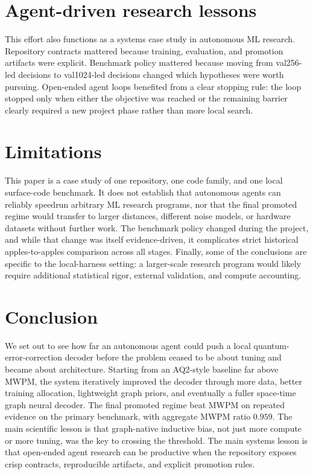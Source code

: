 \documentclass{article}
\begin{document}
\section{Agent-driven research lessons}
This effort also functions as a systems case study in autonomous ML research. Repository contracts mattered because training, evaluation, and promotion artifacts were explicit. Benchmark policy mattered because moving from val256-led decisions to val1024-led decisions changed which hypotheses were worth pursuing. Open-ended agent loops benefited from a clear stopping rule: the loop stopped only when either the objective was reached or the remaining barrier clearly required a new project phase rather than more local search.

\section{Limitations}
This paper is a case study of one repository, one code family, and one local surface-code benchmark. It does not establish that autonomous agents can reliably speedrun arbitrary ML research programs, nor that the final promoted regime would transfer to larger distances, different noise models, or hardware datasets without further work. The benchmark policy changed during the project, and while that change was itself evidence-driven, it complicates strict historical apples-to-apples comparison across all stages. Finally, some of the conclusions are specific to the local-harness setting: a larger-scale research program would likely require additional statistical rigor, external validation, and compute accounting.

\section{Conclusion}
We set out to see how far an autonomous agent could push a local quantum-error-correction decoder before the problem ceased to be about tuning and became about architecture. Starting from an AQ2-style baseline far above MWPM, the system iteratively improved the decoder through more data, better training allocation, lightweight graph priors, and eventually a fuller space-time graph neural decoder. The final promoted regime beat MWPM on repeated evidence on the primary benchmark, with aggregate MWPM ratio $0.959$. The main scientific lesson is that graph-native inductive bias, not just more compute or more tuning, was the key to crossing the threshold. The main systems lesson is that open-ended agent research can be productive when the repository exposes crisp contracts, reproducible artifacts, and explicit promotion rules.
\end{document}
